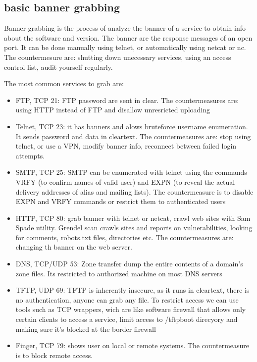 \subsection{basic banner grabbing}
Banner grabbing is the process of analyze the banner of a service to obtain info about the software and version. The banner are the response messages of an open port.
It can be done manually using telnet, or automatically using netcat or nc.
The countermesure are: shutting down unecessary services, using an access control list, audit yourself regularly.

The most common services to grab are:
\begin{itemize}
    \item FTP, TCP 21: FTP password are sent in clear. The countermeasures are: using HTTP instead of FTP and disallow unresricted uploading
    \item Telnet, TCP 23: it has banners and alows bruteforce username enumeration. It sends password and data in cleartext. The countermeasures are: stop using telnet, or use a VPN, modify banner info, reconnect between failed login attempts.
    \item SMTP, TCP 25: SMTP can be enumerated with telnet using the commands VRFY (to confirm names of valid user) and EXPN (to reveal the actual delivery addresses of alias and mailing lists). The countermeasure is to disable EXPN and VRFY commands or restrict them to authenticated users 
    \item HTTP, TCP 80: grab banner with telnet or netcat, crawl web sites with Sam Spade utility. Grendel scan crawls sites and reports on vulnerabilities, looking for comments, robots.txt files, directories etc. The countermeasures are: changing th banner on the web server.
    \item DNS, TCP/UDP 53: Zone transfer dump the entire contents of a domain's zone files. Its restricted to authorized machine on most DNS servers
    \item TFTP, UDP 69: TFTP is inherently insecure, as it runs in cleartext, there is no authentication, anyone can grab any file. To restrict access we can use tools such as TCP wrappers, wich are like software firewall that allows only certain clients to access a service, limit access to /tftpboot direcyory and making sure it's blocked at the border firewall
    \item Finger, TCP 79: shows user on local or remote systems. The countermeasure is to block remote access.
\end{itemize}

